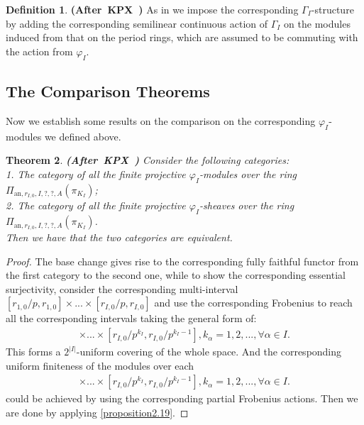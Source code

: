 \documentclass[12pt]{amsart}
\newtheorem{theorem}{Theorem}[section]
\theoremstyle{definition}
\newtheorem{definition}[theorem]{Definition}
\numberwithin{equation}{section}
\begin{document}
\begin{definition}  \mbox{\bf{(After KPX \cite[Definition 2.2.12]{KPX})}}
As in \cite[Definition 2.2.12]{KPX} we impose the corresponding $\Gamma_I$-structure by adding the corresponding semilinear continuous action of $\Gamma_I$ on the modules induced from that on the period rings, which are assumed to be commuting with the action from $\varphi_I$.	
\end{definition}










\subsection{The Comparison Theorems}


\indent Now we establish some results on the comparison on the corresponding $\varphi_I$-modules we defined above. 


\begin{theorem}\mbox{\bf{(After KPX \cite[Proposition 2.2.7]{KPX})}} 
Consider the following categories:\\
1. The category of all the finite projective $\varphi_I$-modules over the ring $\Pi_{\mathrm{an},r_{I,0},I,?,?,A}(\pi_{K_I})$;\\
2. The category of all the finite projective $\varphi_I$-sheaves over the ring $\Pi_{\mathrm{an},r_{I,0},I,?,?,A}(\pi_{K_I})$.\\
Then we have that the two categories are equivalent.	
\end{theorem}


\begin{proof}
The base change gives rise to the corresponding fully faithful functor from the first category to the second one, while to show the corresponding essential surjectivity, consider the corresponding multi-interval $[r_{1,0}/p,r_{1,0}]\times...\times [r_{I,0}/p,r_{I,0}]$ and use the corresponding Frobenius to reach all the corresponding intervals taking the general form of:
\begin{align}
[r_{1,0}/p^{k_1},r_{1,0}/p^{k_1-1}]\times...\times [r_{I,0}/p^{k_I},r_{I,0}/p^{k_I-1}],k_\alpha=1,2,...,\forall\alpha\in I.	
\end{align}
This forms a $2^{|I|}$-uniform covering of the whole space. And the corresponding uniform finiteness of the modules over each 
\begin{align}
[r_{1,0}/p^{k_1},r_{1,0}/p^{k_1-1}]\times...\times [r_{I,0}/p^{k_I},r_{I,0}/p^{k_I-1}],k_\alpha=1,2,...,\forall\alpha\in I.	
\end{align}	
could be achieved by using the corresponding partial Frobenius actions. Then we are done by applying \cref{proposition2.19}.
\end{proof}
\end{document}
